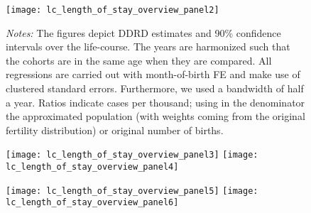 \begin{landscape}
\begin{figure}[H]
\centering
\begin{minipage}{.9\linewidth}
\texttt{[image: lc\_length\_of\_stay\_overview\_panel2]}
{\scriptsize \emph{Notes:} The figures depict DDRD estimates and 90\% confidence intervals over the life-course. The years are harmonized such that the cohorts are in the same age when they are compared. All regressions are carried out with month-of-birth FE and make use of clustered standard errors. Furthermore, we used a bandwidth of half a year. Ratios indicate cases per thousand; using in the denominator the approximated population (with weights coming from the original fertility distribution) or original number of births. \par}
\end{minipage}
\end{figure}
\end{landscape}
\begin{figure}[H]%
	\centering
	\texttt{[image: lc\_length\_of\_stay\_overview\_panel3]}
	\texttt{[image: lc\_length\_of\_stay\_overview\_panel4]}
\end{figure}
\begin{figure}[H]
	\centering	
	\texttt{[image: lc\_length\_of\_stay\_overview\_panel5]}
	\texttt{[image: lc\_length\_of\_stay\_overview\_panel6]}
\end{figure}
